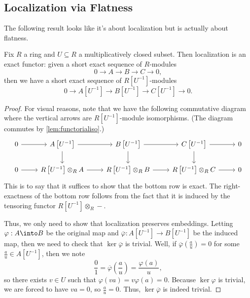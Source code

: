 \subsection{Localization via Flatness}
The following result looks like it's about localization but is actually about flatness.
\begin{proposition} \label{prop:localexact}
	Fix $R$ a ring and $U\subseteq R$ a multiplicatively closed subset. Then localization is an exact functor: given a short exact sequence of $R$-modules
	\[0\to A\to B\to C\to 0,\]
	then we have a short exact sequence of $R\left[U^{-1}\right]$-modules
	\[0\to A\left[U^{-1}\right]\to B\left[U^{-1}\right]\to C\left[U^{-1}\right]\to 0.\]
\end{proposition}
\begin{proof}
	For visual reasons, note that we have the following commutative diagram where the vertical arrows are $R\left[U^{-1}\right]$-module isomorphisms. (The diagram commutes by \autoref{lem:functorialiso}.)
	\[\begin{tikzcd}
		0 & {A\left[U^{-1}\right]} & {B\left[U^{-1}\right]} & {C\left[U^{-1}\right]} & 0 \\
		0 & {R\left[U^{-1}\right]\otimes_RA} & {R\left[U^{-1}\right]\otimes_RB} & {R\left[U^{-1}\right]\otimes_RC} & 0
		\arrow[from=2-2, to=2-3]
		\arrow[from=1-1, to=1-2]
		\arrow[from=2-1, to=2-2]
		\arrow[from=1-2, to=2-2]
		\arrow[from=1-2, to=1-3]
		\arrow[from=1-3, to=2-3]
		\arrow[from=1-3, to=1-4]
		\arrow[from=1-4, to=2-4]
		\arrow[from=1-4, to=1-5]
		\arrow[from=2-3, to=2-4]
		\arrow[from=2-4, to=2-5]
	\end{tikzcd}\]
	This is to say that it suffices to show that the bottom row is exact. The right-exactness of the bottom row follows from the fact that it is induced by the tensoring functor $R\left[U^{-1}\right]\otimes_R-$.

	Thus, we only need to show that localization preserves embeddings. Letting $\varphi:A\into B$ be the original map and $\overline\varphi:A\left[U^{-1}\right]\to B\left[U^{-1}\right]$ be the induced map, then we need to check that $\ker\overline\varphi$ is trivial. Well, if $\overline\varphi\left(\frac au\right)=0$ for some $\frac au\in A\left[U^{-1}\right]$, then we note
	\[\frac01=\overline\varphi\left(\frac au\right)=\frac{\varphi(a)}u,\]
	so there exists $v\in U$ such that $\varphi(va)=v\varphi(a)=0$. Because $\ker\varphi$ is trivial, we are forced to have $va=0$, so $\frac au=0$. Thus, $\ker\overline\varphi$ is indeed trivial.
\end{proof}
